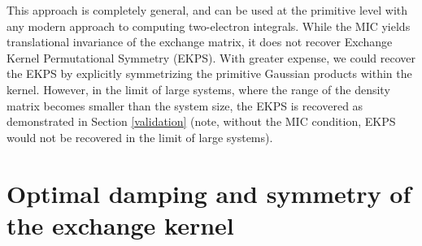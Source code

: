 \documentclass[prb,aps,nobibnotes,twocolumn,doublespace,twocolumngrid,superbib,showpacs]{revtex4}
\begin{document}
This approach is completely general, and can be used at the primitive level with any modern approach
to computing two-electron integrals. While the MIC yields translational invariance of the
exchange matrix, it  does not recover Exchange Kernel Permutational Symmetry (EKPS).  With greater 
expense, we could recover the EKPS by  explicitly symmetrizing the primitive Gaussian 
products within the kernel.  However, in the limit of large systems, where the range of the density 
matrix becomes smaller than the system size, the  EKPS is recovered as demonstrated in Section 
\ref{validation} (note, without the MIC condition, EKPS would not be recovered in the limit of large systems).

\section{Optimal damping and symmetry of the exchange kernel}
\end{document}
